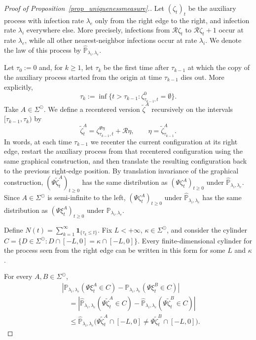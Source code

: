 \documentclass[10pt,a4paper]{amsart}
\begin{document}
	\begin{proof}[{Proof of Proposition~\ref{prop_uniquenessmeasure}.}]
	Let $(\zeta_t)_t$ be the auxiliary process with infection rate $\lambda_e$ only from the right edge to the right, and infection rate $\lambda_i$ everywhere else. More precisely, infections from $\mathcal{R}\zeta_t$ to $\mathcal{R}\zeta_t+1$ occur at rate $\lambda_e$, while all other nearest-neighbor infections occur at rate $\lambda_i$. We denote the law of this process by $\widehat{\mathbb{P}}_{\lambda_i,\lambda_e}$.
			
	Let $\tau_0:=0$ and, for $k\ge1$, let $\tau_k$ be the first time after $\tau_{k-1}$ at which the copy of the auxiliary process started from the origin at time $\tau_{k-1}$ dies out. More explicitly,
		\[\tau_k:=\inf\{t>\tau_{k-1}:\zeta_{\tau_{k-1},t}^{0}=\emptyset\}.\]
	Take $A\in\Sigma^{\odot}$. We define a recentered version $\tilde{\zeta}^A$ recursively on the intervals $[\tau_{k-1},\tau_k)$ by
		\[\tilde{\zeta}^A_t=\zeta_{\tau_{k-1},t}^{\Psi \eta}+\mathcal{R}\eta,\qquad \eta=\tilde{\zeta}^A_{\tau_{k-1}}.\]
	In words, at each time $\tau_{k-1}$ we recenter the current configuration at its right edge, restart the auxiliary process from that recentered configuration using the same graphical construction, and then translate the resulting configuration back to the previous right-edge position. By translation invariance of the graphical construction, $(\Psi\tilde{\zeta}^A_t)_{t\ge0}$ has the same distribution as $(\Psi\zeta^A_t)_{t\ge0}$ under $\widehat{\mathbb{P}}_{\lambda_i,\lambda_e}$. Since $A\in\Sigma^{\odot}$ is semi-infinite to the left, $(\Psi\zeta^A_t)_{t\ge0}$ under $\widehat{\mathbb{P}}_{\lambda_i,\lambda_e}$ has the same distribution as $(\Psi\xi^A_t)_{t\ge0}$ under $\mathbb{P}_{\lambda_i,\lambda_e}$.
	
	Define $N(t)=\sum_{k=1}^{\infty}\mathbf{1}_{\{\tau_k\le t\}}$. Fix $L<+\infty$, $\kappa\in\Sigma^{\odot}$, and consider the cylinder $C=\{D\in\Sigma^{\odot}:D\cap[-L,0]=\kappa\cap[-L,0]\}$. Every finite-dimensional cylinder for the process seen from the right edge can be written in this form for some $L$ and $\kappa$.
	
	For every $A,B\in\Sigma^{\odot}$,
	\begin{equation} \label{eq_difference_cylinder_bound}
		\begin{aligned}
			&|\mathbb{P}_{\lambda_i,\lambda_e}(\Psi\xi_t^A\in C)
			-\mathbb{P}_{\lambda_i,\lambda_e}(\Psi\xi_t^B\in C)|\\
			&\quad=
			|\widehat{\mathbb{P}}_{\lambda_i,\lambda_e}(\Psi\tilde{\zeta}_t^A\in C)
			-\widehat{\mathbb{P}}_{\lambda_i,\lambda_e}(\Psi\tilde{\zeta}_t^B\in C)|\\
			&\quad\leq
			\widehat{\mathbb{P}}_{\lambda_i,\lambda_e}
			\big(\Psi\tilde{\zeta}_t^A\cap[-L,0]
			\neq
			\Psi\tilde{\zeta}_t^B\cap[-L,0]\big).
		\end{aligned}
	\end{equation}
	

\end{proof}
\end{document}
